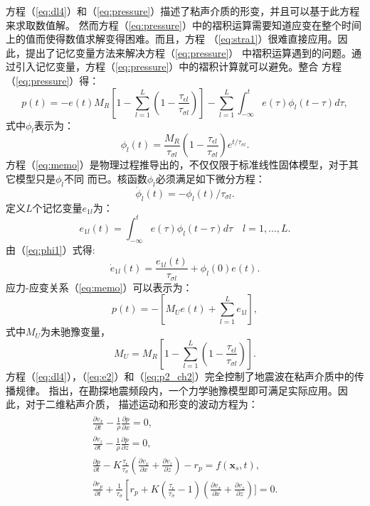 方程（\ref{eq:dl4}）和（\ref{eq:pressure}）描述了粘声介质的形变，并且可以基于此方程来求取数值解。
然而方程（\ref{eq:pressure}）中的褶积运算需要知道应变在整个时间上的值而使得数值求解变得困难。而且，方程
（\ref{eq:stra1}）很难直接应用。因此，提出了记忆变量方法来解决方程（\ref{eq:pressure}）
中褶积运算遇到的问题。通过引入记忆变量，方程（\ref{eq:pressure}）中的褶积计算就可以避免。整合
方程（\ref{eq:pressure}）得：
\begin{equation}
	p(t)=-e(t)M_R[1-\sum_{l=1}^L(1-\frac{\tau_{\epsilon l}}{\tau_{\sigma l}})]-
	\sum_{l=1}^L\int_{-\infty}^{t}e(\tau)\phi_l(t-\tau)d\tau,
	\label{eq:memo}
\end{equation}
式中$\phi_l$表示为：
\begin{equation}
	\phi_l(t)=\frac{M_R}{\tau_{\sigma l}}(1-\frac{\tau_{\epsilon l}}{\tau_{\sigma l}})e^{t/\tau_{\sigma l}}.
	\label{eq:phi1}
\end{equation}
方程（\ref{eq:memo}）是物理过程推导出的，不仅仅限于标准线性固体模型，对于其它模型只是$\phi_l$不同
而已。核函数$\phi_l$必须满足如下微分方程：
\begin{equation}
	\dot{\phi}_l(t)=-\phi_l(t)/\tau_{\sigma l}.
	\label{eq:phi2}
\end{equation}
定义$L$个记忆变量$e_{1l}$为：
\begin{equation}
	e_{1l}(t)=\int^t_{-\infty}e(\tau)\phi_l(t-\tau)d\tau \quad l=1,\dots,L.
\end{equation}
\newpage
\hspace{-2.0em}由（\ref{eq:phi1}）式得:
\begin{equation}
	\dot{e}_{1l}(t)=\frac{e_{1l}(t)}{\tau_{\sigma l}}+\phi_l(0)e(t).
	\label{eq:e2}
\end{equation}
应力-应变关系（\ref{eq:memo}）可以表示为：
\begin{equation}
	p(t)=-[M_Ue(t)+\sum_{l=1}^Le_{1l}],
	\label{eq:p2_ch2}
\end{equation}
式中$M_U$为未驰豫变量，
\begin{equation}
	M_U=M_R[1-\sum_{l=1}^L(1-\frac{\tau_{\epsilon l}}{\tau_{\sigma l}})].
\end{equation}
方程（\ref{eq:dl4}），（\ref{eq:e2}）和（\ref{eq:p2_ch2}）完全控制了地震波在粘声介质中的传播规律。
 指出，在勘探地震频段内，一个力学驰豫模型即可满足实际应用。因此，对于二维粘声介质，
描述运动和形变的波动方程为：
\begin{eqnarray}
    \begin{aligned}
    \label{eq:visco}
    \frac{\partial v_x}{\partial t} - \frac{1}{\rho}\frac{\partial p}{\partial x}=0,\\
    \frac{\partial v_z}{\partial t} - \frac{1}{\rho}\frac{\partial p}{\partial z}=0,\\
    \frac{\partial p}{\partial t} -
    K\frac{\tau_\epsilon}{\tau_\sigma}(\frac{\partial v_x}{\partial x}+\frac{\partial v_z}{\partial z})-r_p=f(\mathbf{x}_s,t),
    \\
    \frac{\partial{r_p}}{\partial t} +
    \frac{1}{\tau_\sigma}\left[r_p+K(\frac{\tau_\epsilon}{\tau_\sigma}-1)
	(\frac{\partial v_x}{\partial x}+\frac{\partial v_z}{\partial z})]=0.
    \end{aligned}
\end{eqnarray}
